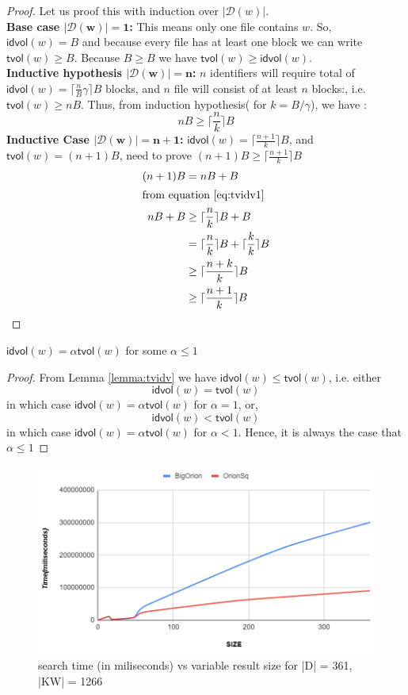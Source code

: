 \documentclass[sigconf]{acmart}
\newcommand{\DB}[1]{\mathcal{D}(#1)}
\newcommand{\vol}[1]{\lvert{#1}\rvert}
\newcommand{\ceil}[1]{\lceil #1 \rceil}
\newcommand{\al}{\alpha}
\newcommand{\tvol}[1]{\textsf{tvol}({#1})}
\newcommand{\idvol}[1]{\textsf{idvol}({#1})}
\begin{document}
\begin{proof}
Let us proof this with induction over $\vol{\DB{w}}$.\\
\textbf{Base case $\mathbf{\vol{\DB{w}}=1}$:}
This means only one file contains $w$. So,
$\idvol{w}=B$ and because every file has at least one block we can write $\tvol{w} \geq B$. Because $B \geq B$ we have  
$\tvol{w} \geq \idvol{w}$.\\
\textbf{Inductive hypothesis $\mathbf{\vol{\DB{w}}=n}$:} $n$ identifiers will require total of $\idvol{w} =\ceil{\frac{n}{B}\gamma}B$ blocks, and $n$ file will consist of at least $n$ blocks:, i.e. 
$\tvol{w} \geq nB$. Thus, from induction hypothesis( for $k=B/\gamma$), we have : 
\begin{equation}\label{eq:tvidv1}
nB \geq \ceil{\frac{n}{k}}B
\end{equation}
\textbf{Inductive Case $\mathbf{\vol{\DB{w}}=n+1}$:} $\idvol{w} =\ceil{\frac{n+1}{k}}B$, and $\tvol{w} = (n+1)B$, need to prove $(n+1)B \geq \ceil{\frac{n+1}{k}}B$
\begin{align*}
    (n+1)B & = nB +B \\ \intertext{from equation \ref{eq:tvidv1}}
        nB +B   & \geq \ceil{\frac{n}{k}}B +B \\
           & = \ceil{\frac{n}{k}}B +\ceil{\frac{k}{k}}B \\
           & \geq \ceil{\frac{n+k}{k}}B\\
           & \geq \ceil{\frac{n+1}{k}}B
\end{align*}
\end{proof}

\begin{lemma}
$ \idvol{w} = \alpha \tvol{w}$ for some $\alpha \leq 1$
\end{lemma}
\begin{proof}
From Lemma \ref{lemma:tvidv} we have $\idvol{w} \leq \tvol{w}$, i.e. either
$$\idvol{w} = \tvol{w}$$ in which case $\idvol{w} = \al \tvol{w}$ for $\al = 1$, or,
$$\idvol{w} < \tvol{w}$$
in which case $\idvol{w} = \al \tvol{w}$ for $\al < 1$. Hence, it is always the case that $\al \leq 1$
\end{proof}
\begin{figure}
\includegraphics[scale=.3]{pictures/svsressize1.png}
\caption{search time (in miliseconds) vs variable result size for |D| = 361, |KW| = 1266 }
\end{figure}
\end{document}
